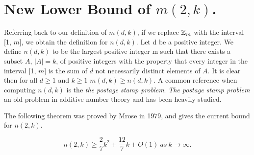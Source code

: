 \section{ New Lower Bound of $m(2, k)$.}
Referring back to our definition of $m(d, k)$, if we replace $\mbox{$\mathbb Z$}_m$ with the interval [1, $m$], we obtain the definition for $n(d, k)$. Let d be a positive integer. We define $n(d, k)$ to be the largest positive integer m such that there exists a subset $A$, $|A| = k$, of positive integers with the property that every integer in the interval [1, $m$] is the sum of $d$ not necessarily distinct elements of $A$. It is clear then for all $d \geq 1$ and $k \geq 1$ $m(d, k) \geq n(d, k)$. A common reference when computing $n(d, k)$ is the \emph{the postage stamp problem}. \emph{The postage stamp problem} an old problem in additive number theory and has been heavily studied. 

The following theorem was proved by Mrose in 1979, and gives the current bound for $n(2, k)$.
\begin{theorem}
\[
n(2, k) \geq \frac{2}{7}k^2 + \frac{12}{7}k + O(1)\  as \  k \to \infty.
\]
\end{theorem}

